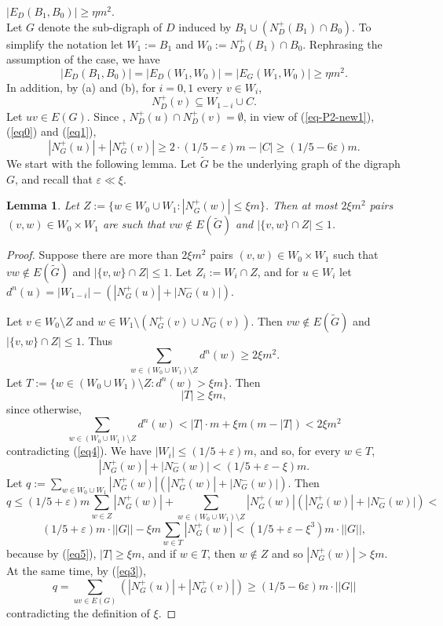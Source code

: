 \documentclass{article}
\newtheorem{lemma}[theorem]{Lemma}
\renewcommand{\epsilon}{{\varepsilon}}
\begin{document}
 $|E_D(B_1, B_0)|\geq \eta m^2$.\\
Let $G$ denote the sub-digraph of $D$ induced by $B_1\cup (N^+_D(B_1)\cap B_0)$. To simplify the notation let $W_1:= B_1$ and $W_0:=N^+_D(B_1)\cap B_0$. 
Rephrasing the assumption of the case, we have
\begin{equation}\label{eq-case1}
    |E_D(B_1, B_0)| = |E_D(W_1, W_0)|=|E_G(W_1, W_0)|\geq \eta m^2.
\end{equation}
In addition, by (a) and (b), for $i=0,1$ every $v\in W_i$, 
\begin{equation}\label{eq1}
    N^+_D(v)\subseteq W_{1-i}\cup C.
\end{equation}
Let $uv\in E(G)$. Since , $N^+_D(u)\cap N^+_D(v)=\emptyset$, in view of (\ref{eq-P2-new1}), (\ref{eq0}) and (\ref{eq1}), 
\begin{equation}\label{eq3}
    |N^+_G(u)|+|N^+_G(v)|\geq 2\cdot(1/5-\epsilon)m - |C|\geq
    (1/5- 6\epsilon)m.
\end{equation}
We start with the following lemma. Let $\widetilde{G}$ be the underlying graph of the digraph $G$, and recall that $\epsilon \ll \xi$.
\begin{lemma}\label{non-ext-lem0}
Let $Z:=  \{w\in W_0\cup W_1: |N^+_G(w)|\leq \xi m\}$. Then at most $2\xi m^2$ pairs $(v,w)\in W_0\times W_1$ are such that $vw\notin E(\widetilde{G})$ and $|\{v,w\}\cap Z|\leq 1$.
\end{lemma}
\begin{proof}
Suppose there are more than $2\xi m^2$ pairs $(v,w)\in W_0\times W_1$ such that $vw \notin E(\widetilde{G})$  and $|\{v,w\}\cap Z|\leq 1.$
Let $Z_i:= W_i\cap Z$, and for $u\in W_i$ let $d^n(u)=|W_{1-i}|- (|N^+_G(u)|+|N^-_G(u)|).$ 


Let $v\in W_0\setminus Z$ and $w\in W_1\setminus (N^+_G(v)\cup N^-_G(v))$. Then $vw \notin E(\widetilde{G})$ and $|\{v,w\}\cap Z|\leq 1$. Thus
\begin{equation}\label{eq4}
\sum_{w\in (W_0\cup W_1)\setminus Z} d^n(w) \geq 2\xi m^2.
\end{equation}
Let $T:= \{w\in (W_0\cup W_1)\setminus Z: d^n(w)>\xi m\}.$
Then \begin{equation}\label{eq5}|T|\geq {\xi}m,\end{equation} 
since otherwise, $$\sum_{w\in (W_0\cup W_1)\setminus Z} d^n(w) < |T|\cdot m+ {\xi}m(m-|T|)< 2\xi m^2 $$
contradicting (\ref{eq4}).
We have $|W_i|\leq (1/5+\epsilon)m$, and so, for every $w\in T$, $$|N^+_G(w)|+|N^-_G(w)|< (1/5+\epsilon -\xi)m.$$
Let $q:=\sum_{w\in W_0\cup W_1} |N^+_G(w)|(|N^+_G(w)|+|N^-_G(w)|).$ Then
$$q \leq(1/5+\epsilon)m\sum_{w\in Z}|N^+_G(w)| + \sum_{w\in (W_0\cup W_1)\setminus Z} |N^+_G(w)|(|N^+_G(w)|+|N^-_G(w)|)< $$
$$(1/5+\epsilon)m\cdot ||G|| - \xi m\sum_{w\in T}|N^+_G(w)|<(1/5+\epsilon -\xi^3)m\cdot ||G||,$$
because by (\ref{eq5}), $|T|\geq \xi m$, and if $w\in T$, then $w\notin Z$ and so $|N^+_G(w)|>\xi m.$
At the same time, by (\ref{eq3}),
$$q= \sum_{uv\in E(G)}(|N^+_G(u)|+|N^+_G(v)|)\geq (1/5-6\epsilon)m\cdot ||G||$$
contradicting the definition of $\xi$.
\end{proof}
\end{document}
